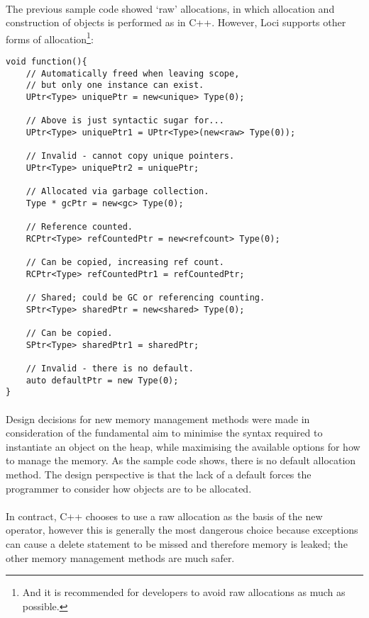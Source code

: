 \documentclass[12pt,twoside,notitlepage]{report}
\begin{document}
\paragraph{}
The previous sample code showed `raw' allocations, in which allocation and construction of objects is performed as in C++. However, Loci supports other forms of allocation\footnote{And it is recommended for developers to avoid raw allocations as much as possible.}:


\begin{lstlisting}
void function(){
	// Automatically freed when leaving scope,
	// but only one instance can exist.
	UPtr<Type> uniquePtr = new<unique> Type(0);
	
	// Above is just syntactic sugar for...
	UPtr<Type> uniquePtr1 = UPtr<Type>(new<raw> Type(0));
	
	// Invalid - cannot copy unique pointers.
	UPtr<Type> uniquePtr2 = uniquePtr;
	
	// Allocated via garbage collection.
	Type * gcPtr = new<gc> Type(0);
	
	// Reference counted.
	RCPtr<Type> refCountedPtr = new<refcount> Type(0);
	
	// Can be copied, increasing ref count.
	RCPtr<Type> refCountedPtr1 = refCountedPtr;
	
	// Shared; could be GC or referencing counting.
	SPtr<Type> sharedPtr = new<shared> Type(0);
	
	// Can be copied.
	SPtr<Type> sharedPtr1 = sharedPtr;
	
	// Invalid - there is no default.
	auto defaultPtr = new Type(0);
}
\end{lstlisting}


\paragraph{}
Design decisions for new memory management methods were made in consideration of the fundamental aim to minimise the syntax required to instantiate an object on the heap, while maximising the available options for how to manage the memory. As the sample code shows, there is no default allocation method. The design perspective is that the lack of a default forces the programmer to consider how objects are to be allocated.

\paragraph{}
In contract, C++ chooses to use a raw allocation as the basis of the new operator, however this is generally the most dangerous choice because exceptions can cause a delete statement to be missed and therefore memory is leaked; the other memory management methods are much safer.
\end{document}

